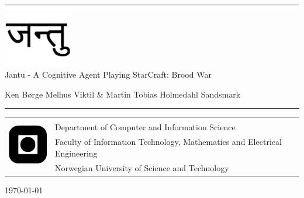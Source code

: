 \documentclass[a4paper, twoside, openright, 12pt]{report}
\title{\papertitle}
\author{\authors}
\def \authors {Ken B\o{}rge Melhus Viktil \& Martin Tobias Holmedahl Sandsmark}
\def \papertitle {Jantu - A Cognitive Agent Playing StarCraft: Brood War}
\begin{document}
\begin{titlepage}
\begin{center}

\vspace*{5cm}
\hrule height 1pt
\includegraphics[width=30mm]{graphics/jantu.pdf}\\
\huge{\papertitle}

\vspace{.5cm}
\large{\authors}
\vspace{.5cm}
\hrule height 1pt

\vspace{6cm}
\end{center}
\normalsize
\begin{table}[!h]
\begin{tabular}{ll}
\multirow{4}{*}{\includegraphics[width=20mm]{graphics/logo.png}} & \\
& Department of Computer and Information Science \\
& Faculty of Information Technology, Mathematics and Electrical Engineering \\
& Norwegian University of Science and Technology \\
\end{tabular}
\end{table}
\vspace{.5cm}
\begin{center}
\today
\end{center}
\end{titlepage}

\thispagestyle{empty}
\cleardoublepage

\begin{abstract}
It has been shown that most players enjoys playing versus other human players over computer controlled opponents, but most artificial intelligence agents created today focus on winning in the most effective way possible. 
Cognitive architectures are designed to emulate how the human brain operates when performing tasks. Very little research has been done on applying cognitive methods to the field of real-time strategy games. 
In this paper we aim to research the use of a cognitive model that is capable of playing StarCraft: Brood War with decent results. The result is an AI agent implemented with a cognitive framework called LIDA. The resulting agent is only a proof of concept implementation, but we provide suggestions for how it can be improved in the future, and what the problems and limitations of the methods is. 
\end{abstract}
\thispagestyle{empty}
\cleardoublepage
\end{document}
